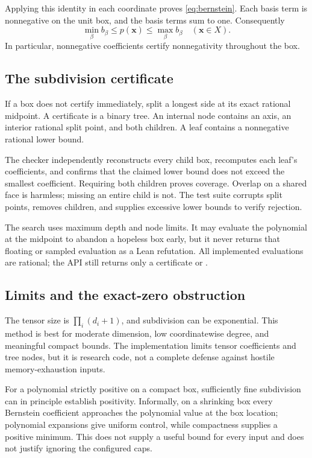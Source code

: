 Applying this identity in each coordinate proves \eqref{eq:bernstein}. Each basis term is nonnegative on the unit box, and the basis terms sum to one. Consequently
\[
 \min_\beta b_\beta\le p(\bm x)\le\max_\beta b_\beta
 \quad(\bm x\in X).
\]
In particular, nonnegative coefficients certify nonnegativity throughout the box.

\subsection{The subdivision certificate}

If a box does not certify immediately, split a longest side at its exact rational midpoint. A certificate is a binary tree. An internal node contains an axis, an interior rational split point, and both children. A leaf contains a nonnegative rational lower bound.

The checker independently reconstructs every child box, recomputes each leaf's coefficients, and confirms that the claimed lower bound does not exceed the smallest coefficient. Requiring both children proves coverage. Overlap on a shared face is harmless; missing an entire child is not. The test suite corrupts split points, removes children, and supplies excessive lower bounds to verify rejection.

The search uses maximum depth and node limits. It may evaluate the polynomial at the midpoint to abandon a hopeless box early, but it never returns that floating or sampled evaluation as a Lean refutation. All implemented evaluations are rational; the API still returns only a certificate or \unknown{}.

\subsection{Limits and the exact-zero obstruction}

The tensor size is $\prod_i(d_i+1)$, and subdivision can be exponential. This method is best for moderate dimension, low coordinatewise degree, and meaningful compact bounds. The implementation limits tensor coefficients and tree nodes, but it is research code, not a complete defense against hostile memory-exhaustion inputs.

For a polynomial strictly positive on a compact box, sufficiently fine subdivision can in principle establish positivity. Informally, on a shrinking box every Bernstein coefficient approaches the polynomial value at the box location; polynomial expansions give uniform control, while compactness supplies a positive minimum. This does not supply a useful bound for every input and does not justify ignoring the configured caps.

